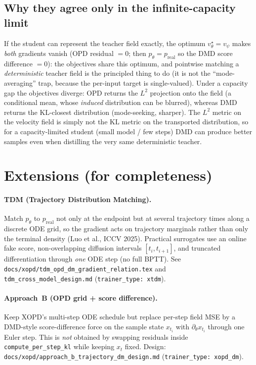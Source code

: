 \documentclass[11pt,a4paper]{article}
\newcommand{\KL}{\mathrm{KL}}
\newcommand{\real}{\mathrm{real}}
\begin{document}
\subsection{Why they agree only in the infinite-capacity limit}
If the student can represent the teacher field exactly, the optimum $v_\theta^\star=v_\psi$ makes
\emph{both} gradients vanish (OPD residual $=0$; then $p_\theta=p_{\real}$ so the DMD score
difference $=0$): the objectives share this optimum, and pointwise matching a \emph{deterministic}
teacher field is the principled thing to do (it is not the ``mode-averaging'' trap, because the
per-input target is single-valued). Under a capacity gap the objectives diverge: OPD returns the
$L^2$ projection onto the field (a conditional mean, whose \emph{induced} distribution can be
blurred), whereas DMD returns the $\KL$-closest distribution (mode-seeking, sharper). The $L^2$
metric on the velocity field is simply not the $\KL$ metric on the transported distribution, so for
a capacity-limited student (small model / few steps) DMD can produce better samples even when
distilling the very same deterministic teacher.

\section{Extensions (for completeness)}
\paragraph{TDM (Trajectory Distribution Matching).} Match $p_\theta$ to $p_{\real}$ not only at the
endpoint but at several trajectory times along a discrete ODE grid, so the gradient acts on
trajectory marginals rather than only the terminal density (Luo et al., ICCV 2025). Practical
surrogates use an online fake score, non-overlapping diffusion intervals $[t_i,t_{i+1}]$, and
truncated differentiation through \emph{one} ODE step (no full BPTT). See
\texttt{docs/xopd/tdm\_opd\_dm\_gradient\_relation.tex} and \texttt{tdm\_cross\_model\_design.md}
(\texttt{trainer\_type: xtdm}).
\paragraph{Approach~B (OPD grid + score difference).} Keep XOPD's multi-step ODE schedule but
replace per-step field MSE by a DMD-style score-difference force on the sample state $x_{t_i}$
with $\partial_\theta x_{t_i}$ through one Euler step. This is \emph{not} obtained by swapping
residuals inside \texttt{compute\_per\_step\_kl} while keeping $x_t$ fixed. Design:
\texttt{docs/xopd/approach\_b\_trajectory\_dm\_design.md} (\texttt{trainer\_type: xopd\_dm}).
\end{document}
